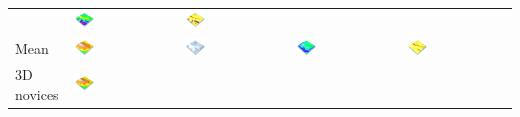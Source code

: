 \documentclass[Afour,sageh,times]{sagej}
\begin{document}
\begin{table}[h]
\begin{tabular}{m{} m{} m{} m{} m{}}
&
\includegraphics[width=0.2\textwidth]{images/render_3d/3d_experts/slope_4.png} &
\includegraphics[width=0.2\textwidth]{images/render_3d/3d_experts/forms_4.png}\\
%
Mean & 
\includegraphics[width=0.2\textwidth]{images/render_3d/participants/mean_dem_4.png} &
\includegraphics[width=0.2\textwidth]{images/render_3d/participants/stdev_regression_difference_series_4.png} &
\includegraphics[width=0.2\textwidth]{images/render_3d/participants/mean_slope_4.png} &
\includegraphics[width=0.2\textwidth]{images/render_3d/participants/mean_forms_4.png}\\
%
3D novices & 
\includegraphics[width=0.2\textwidth]{images/render_3d/3d_novices/mean_dem_4.png} &

\end{tabular}
\end{table}
\end{document}
